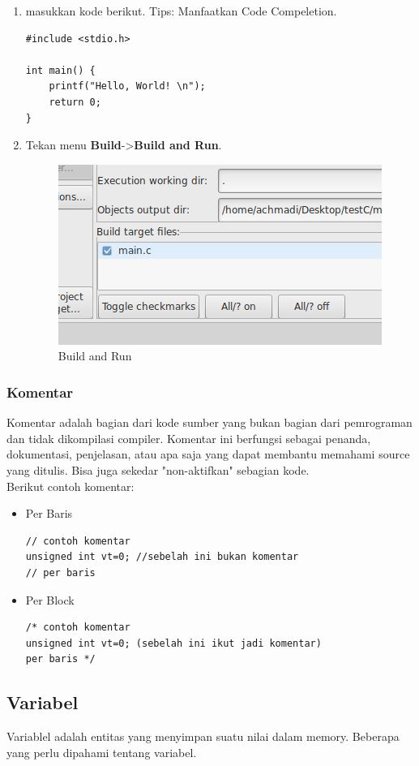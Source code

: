 \documentclass[12pt,]{article}
\begin{document}
\begin{enumerate}
		\item masukkan kode berikut.
		Tips: Manfaatkan Code Compeletion.
		\begin{verbatim}
#include <stdio.h>

int main() {
	printf("Hello, World! \n");
	return 0;
}
		\end{verbatim}
		\item Tekan menu \textbf{Build}->\textbf{Build and Run}.
		\begin{figure}[H]
			\centering
			\includegraphics[width=0.4\linewidth]{images/c_cb_9}
			\caption{Build and Run}
		\end{figure}
			
	\end{enumerate}

	\subsubsection{Komentar}
	Komentar adalah bagian dari kode sumber yang bukan bagian dari pemrograman dan tidak dikompilasi compiler.
	Komentar ini berfungsi sebagai penanda, dokumentasi, penjelasan, atau apa saja yang dapat membantu memahami source yang ditulis.
	Bisa juga sekedar "non-aktifkan" sebagian kode.\\
	Berikut contoh komentar:
	\begin{itemize}
		\item Per Baris
		\begin{verbatim}
// contoh komentar
unsigned int vt=0; //sebelah ini bukan komentar
// per baris
		\end{verbatim}
		
		\item Per Block
		\begin{verbatim}
/* contoh komentar
unsigned int vt=0; (sebelah ini ikut jadi komentar)
per baris */
		\end{verbatim}
	\end{itemize}

	\newpage
	\subsection{Variabel}
	Variablel adalah entitas yang menyimpan suatu nilai dalam memory.
	Beberapa yang perlu dipahami tentang variabel.
	
\end{document}
